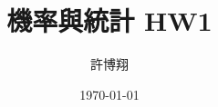 \setlength{\parindent}{0pt}

\title{機率與統計 HW1}
\author{許博翔}
\date{\today}
\maketitle
\thispagestyle{empty}
\setcounter{page}{1}
\pagestyle{fancy}

\renewcommand{\sectionmark}[1]{\markright{#1}}
\renewcommand{\subsectionmark}[1]{}

\lhead{\thetitle}
\chead{}
\rhead{}
\cfoot{}
\rfoot{\thepage}
\renewcommand{\headrulewidth}{0.4pt}
\renewcommand{\footrulewidth}{0.4pt}









\newpage
